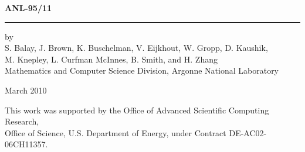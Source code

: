\documentclass[twoside,11pt]{../sty/report_petsc}
\begin{document}



\hfill {\large{\bf ANL-95/11}}

\vspace*{3in}
\vspace*{8pt}
\hrule
\vspace*{8pt}

\vspace*{1in}
\noindent by \\
S. Balay, J. Brown, K. Buschelman, V. Eijkhout, W. Gropp, D. Kaushik, \\
M. Knepley, L. Curfman McInnes, B. Smith, and H. Zhang \\
Mathematics and Computer Science Division, Argonne National Laboratory

\vspace*{10pt}
\noindent March 2010

\vspace*{20pt}
\noindent This work was supported by the Office of Advanced Scientific Computing Research, \\
Office of Science, U.S. Department of Energy, under Contract DE-AC02-06CH11357.

\end{document}

